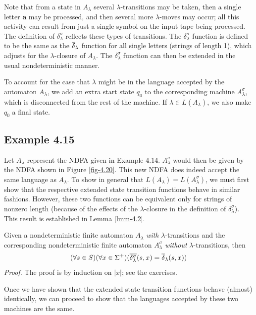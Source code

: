 Note that from a state in $A_{\lambda}$ several $\lambda$-transitions may be
taken, then a single letter $\pmb{a}$ may be processed, and then several more
$\lambda$-moves may occur; all this activity can result from just a single
symbol on the input tape being processed. The definition of
$\delta^{\sigma}_{\lambda}$ reflects these types of transitions. The
$\delta^{\sigma}_{\lambda}$ function is defined to be the same as the
$\overline{\delta}_{\lambda}$ function for all single letters (strings of length 1), which
adjusts for the $\lambda$-closure of $A_{\lambda}$. The
$\delta^{\sigma}_{\lambda}$ function can then be extended in the usual
nondeterministic manner.

To account for the case that $\lambda$ might be in the language accepted by the
automaton $A_{\lambda}$, we add an extra start state $q_0$ to the corresponding
machine $A^{\sigma}_{\lambda}$, which is disconnected from the rest of the
machine. If $\lambda\in L(A_{\lambda})$, we also make $q_0$ a final state.

\subsection*{Example 4.15}

Let $A_{\lambda}$ represent the NDFA given in Example 4.14. $A^{\sigma}_{\lambda}$ would
then be given by the NDFA shown in Figure \ref{fig-4.20}. This new NDFA does indeed accept
the same language as $A_{\lambda}$. To show in general that $L(A_{\lambda}) =
L(A^{\sigma}_{\lambda})$, we must first show that the respective extended state
transition functions behave in similar fashions. However, these two functions
can be equivalent only for strings of nonzero length (because of the effects of
the $\lambda$-closure in the definition of $\delta^{\sigma}_{\lambda}$). This
result is established in Lemma \ref{lmm-4.2}.

\begin{lmm}\label{lmm-4.2}
Given a nondeterministic finite automaton $A_{\lambda}$ \emph{with}
$\lambda$-transitions and the corresponding nondeterministic finite automaton
$A^{\sigma}_{\lambda}$ \emph{without} $\lambda$-transitions, then
\[ (\forall s \in S)(\forall x \in \Sigma^+)(\overline{\delta^{\sigma}_{\lambda}}(s,x) =
	\overline{\delta}_{\lambda}(s,x)) \]
\emph{Proof.} The proof is by induction on $|x|$; see the exercises.
\end{lmm}

Once we have shown that the extended state transition functions behave
(almost) identically, we can proceed to show that the languages accepted by
these two machines are the same.


